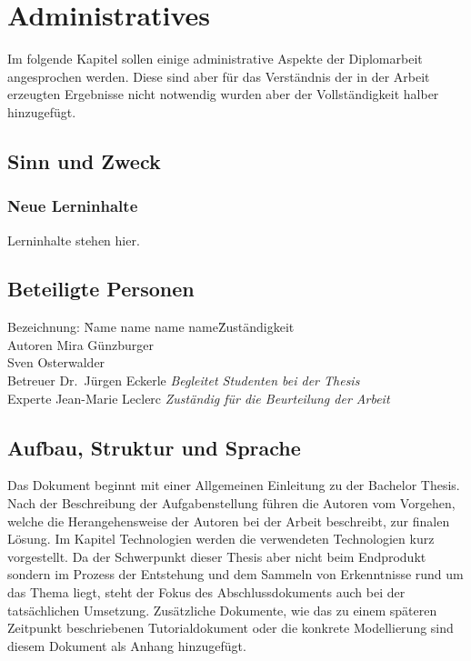 \chapter{Administratives}
\label{chap:administratives}

Im folgende Kapitel sollen einige administrative Aspekte der Diplomarbeit angesprochen werden. Diese sind aber für das Verständnis der in der Arbeit erzeugten Ergebnisse nicht notwendig wurden aber der Vollständigkeit halber hinzugefügt.

\section{Sinn und Zweck}
\label{sec:admin_sinn}

\subsection{Neue Lerninhalte}
\label{subsec:admin_sinn_lerninhalte}
Lerninhalte stehen hier.

\section{Beteiligte Personen}
\label{sec:admin_beteiligte}
\begin{tabbing} %
Bezeichnung: \= Name name name name\= Zuständigkeit \kill \\
    Autoren         \> Mira Günzburger\protect\footnotemark[1]{}    \> \\
                    \> Sven Osterwalder\protect\footnotemark[2]{} \> \\
    Betreuer        \> Dr.\ Jürgen Eckerle\protect\footnotemark[3]{}  \> \textit{Begleitet Studenten bei der Thesis}\\
    Experte         \> Jean-Marie Leclerc   \> \textit{Zuständig für die Beurteilung der Arbeit}
\end{tabbing}

\section{Aufbau, Struktur und Sprache}
\label{sec:admin_aufbau}
Das Dokument beginnt mit einer Allgemeinen Einleitung zu der Bachelor Thesis. Nach der Beschreibung der Aufgabenstellung führen die Autoren vom Vorgehen, welche die Herangehensweise der Autoren bei der Arbeit beschreibt, zur finalen Lösung. Im Kapitel Technologien werden die verwendeten Technologien kurz vorgestellt. Da der Schwerpunkt dieser Thesis aber nicht beim Endprodukt sondern im Prozess der Entstehung und dem Sammeln von Erkenntnisse rund um das Thema liegt, steht der Fokus des Abschlussdokuments auch bei der tatsächlichen Umsetzung. 
Zusätzliche Dokumente, wie das zu einem späteren Zeitpunkt beschriebenen Tutorialdokument oder die konkrete Modellierung sind diesem Dokument als Anhang hinzugefügt.

